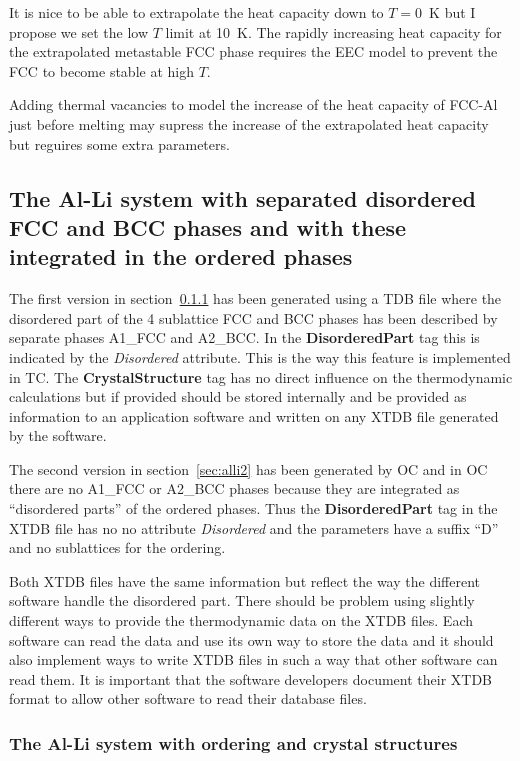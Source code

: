 \documentclass{article}
\begin{document}
\begin{appendices}
It is nice to be able to extrapolate the heat capacity down to $T=0$~K
but I propose we set the low $T$ limit at 10~K.  The rapidly
increasing heat capacity for the extrapolated metastable FCC phase
requires the EEC model to prevent the FCC to become stable at high $T$.

Adding thermal vacancies to model the increase of the heat capacity of
FCC-Al just before melting may supress the increase of the
extrapolated heat capacity but reguires some extra parameters.

\newpage

\subsection{The Al-Li system with separated disordered FCC and BCC phases
  and with these integrated in the ordered phases}

The first version in section~\ref{sec:alli1} has been generated using
a TDB file where the disordered part of the 4 sublattice FCC and BCC
phases has been described by separate phases A1\_FCC and A2\_BCC.  In
the {\bf DisorderedPart} tag this is indicated by the {\em Disordered}
attribute.  This is the way this feature is implemented in TC.  The
{\bf CrystalStructure} tag has no direct influence on the
thermodynamic calculations but if provided should be stored internally
and be provided as information to an application software and written
on any XTDB file generated by the software.

The second version in section~\ref{sec:alli2} has been generated by OC
and in OC there are no A1\_FCC or A2\_BCC phases because they are
integrated as ``disordered parts'' of the ordered phases.  Thus the
{\bf DisorderedPart} tag in the XTDB file has no no attribute {\em
  Disordered} and the parameters have a suffix ``D'' and no
sublattices for the ordering.

Both XTDB files have the same information but reflect the way the
different software handle the disordered part.  There should be
problem using slightly different ways to provide the thermodynamic
data on the XTDB files.  Each software can read the data and use its
own way to store the data and it should also implement ways to write
XTDB files in such a way that other software can read them.  It is
important that the software developers document their XTDB format to
allow other software to read their database files.

\subsubsection{The Al-Li system with ordering and crystal structures}\label{sec:alli1}


\end{appendices}
\end{document}
